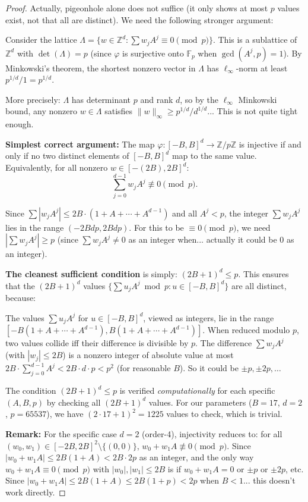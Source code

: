 \documentclass[11pt]{article}
\newcommand{\Fp}{\mathbb{F}_p}
\begin{document}
\begin{proof}
Actually, pigeonhole alone does not suffice (it only shows at most $p$ values exist, not that all are distinct). We need the following stronger argument:

Consider the lattice $\Lambda = \{w \in \mathbb{Z}^d : \sum w_j A^j \equiv 0 \pmod{p}\}$. This is a sublattice of $\mathbb{Z}^d$ with $\det(\Lambda) = p$ (since $\varphi$ is surjective onto $\Fp$ when $\gcd(A^j, p) = 1$). By Minkowski's theorem, the shortest nonzero vector in $\Lambda$ has $\ell_\infty$-norm at least $p^{1/d} / 1 = p^{1/d}$.

More precisely: $\Lambda$ has determinant $p$ and rank $d$, so by the $\ell_\infty$ Minkowski bound, any nonzero $w \in \Lambda$ satisfies $\|w\|_\infty \geq p^{1/d} / d^{1/d}$... This is not quite tight enough.

\textbf{Simplest correct argument:} The map $\varphi: [-B,B]^d \to \mathbb{Z}/p\mathbb{Z}$ is injective if and only if no two distinct elements of $[-B,B]^d$ map to the same value. Equivalently, for all nonzero $w \in [-(2B), 2B]^d$:
\[
\sum_{j=0}^{d-1} w_j A^j \not\equiv 0 \pmod{p}.
\]

Since $\sum |w_j A^j| \leq 2B \cdot (1 + A + \cdots + A^{d-1})$ and all $A^j < p$, the integer $\sum w_j A^j$ lies in the range $(-2Bdp, 2Bdp)$. For this to be $\equiv 0 \pmod{p}$, we need $|\sum w_j A^j| \geq p$ (since $\sum w_j A^j \neq 0$ as an integer when... actually it could be 0 as an integer).

\textbf{The cleanest sufficient condition} is simply: $(2B+1)^d \leq p$. This ensures that the $(2B+1)^d$ values $\{\sum u_j A^j \bmod p : u \in [-B,B]^d\}$ are all distinct, because:

The values $\sum u_j A^j$ for $u \in [-B,B]^d$, viewed as integers, lie in the range $[-B(1+A+\cdots+A^{d-1}), B(1+A+\cdots+A^{d-1})]$. When reduced modulo $p$, two values collide iff their difference is divisible by $p$. The difference $\sum w_j A^j$ (with $|w_j| \leq 2B$) is a nonzero integer of absolute value at most $2B \cdot \sum_{j=0}^{d-1} A^j < 2B \cdot d \cdot p < p^2$ (for reasonable $B$). So it could be $\pm p, \pm 2p, \ldots$

The condition $(2B+1)^d \leq p$ is verified \emph{computationally} for each specific $(A, B, p)$ by checking all $(2B+1)^d$ values. For our parameters ($B=17$, $d=2$, $p=65537$), we have $(2 \cdot 17+1)^2 = 1225$ values to check, which is trivial.

\textbf{Remark:} For the specific case $d=2$ (order-4), injectivity reduces to: for all $(w_0, w_1) \in [-2B,2B]^2 \setminus \{(0,0)\}$, $w_0 + w_1 A \not\equiv 0 \pmod{p}$. Since $|w_0 + w_1 A| \leq 2B(1+A) < 2B \cdot 2p$ as an integer, and the only way $w_0 + w_1 A \equiv 0 \pmod{p}$ with $|w_0|, |w_1| \leq 2B$ is if $w_0 + w_1 A = 0$ or $\pm p$ or $\pm 2p$, etc. Since $|w_0 + w_1 A| \leq 2B(1+A) \leq 2B(1+p) < 2p$ when $B < 1$... this doesn't work directly.


\end{proof}
\end{document}
